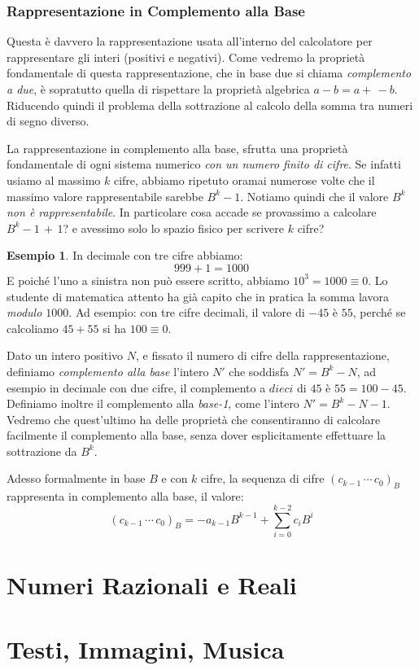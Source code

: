 \documentclass[a4paper]{book}
\theoremstyle{definition}
\newtheorem{ex}{Esempio}
\begin{document}
\subsubsection{Rappresentazione in Complemento alla Base}

Questa è davvero la rappresentazione usata all'interno del calcolatore per
rappresentare gli interi (positivi e negativi). Come vedremo la proprietà
fondamentale di questa rappresentazione, che in base due si chiama \emph{complemento a due}, è sopratutto quella di rispettare la proprietà algebrica $a - b = a +\, -b$. Riducendo quindi il problema della sottrazione
al calcolo della somma tra numeri di segno diverso.

La rappresentazione in complemento alla base, sfrutta una proprietà fondamentale
di ogni sistema numerico \emph{con un numero finito di cifre}. Se infatti usiamo al massimo $k$ cifre, abbiamo ripetuto oramai numerose volte che il massimo valore rappresentabile sarebbe $B^k-1$. Notiamo quindi che il valore
$B^k$ \emph{non è rappresentabile}. In particolare cosa accade se provassimo a calcolare $B^k-1\,+\,1$? e avessimo solo lo spazio fisico per scrivere $k$ cifre?

\begin{ex} In decimale con tre cifre abbiamo:
	\[ \boxed{9}\boxed{9}\boxed{9} + 1 = 1\boxed{0}\boxed{0}\boxed{0} \]
E poiché l'uno a sinistra non può essere scritto, abbiamo $10^3 = 1000 \equiv 0$. Lo studente di matematica attento ha già capito che in pratica la somma lavora \emph{modulo $1000$}. Ad esempio: con tre cifre decimali, il valore di $-45$ è $55$, perché se calcoliamo $45 + 55$ si ha $100 \equiv 0$.
\end{ex}

Dato un intero positivo $N$, e fissato il numero di cifre della rappresentazione, definiamo \emph{complemento alla base} l'intero $N'$
che soddisfa $N'= B^k-N$, ad esempio in decimale con due cifre,
il complemento a $dieci$ di $45$ è $55 = 100-45$. Definiamo inoltre il complemento alla \emph{base-1}, come l'intero $N' = B^k-N-1$. Vedremo che
quest'ultimo ha delle proprietà che consentiranno di calcolare facilmente il complemento alla base, senza dover esplicitamente effettuare la sottrazione da $B^k$.

Adesso formalmente in base $B$ e con $k$ cifre, la sequenza di cifre $(c_{k-1}\,\cdots\,c_{0})_B$ rappresenta in complemento alla base, il valore:
\[ (c_{k-1}\,\cdots\,c_{0})_B = -a_{k-1}B^{k-1}+\sum_{i=0}^{k-2} c_iB^i \] 


\section{Numeri Razionali e Reali}

\section{Testi, Immagini, Musica}
\end{document}
